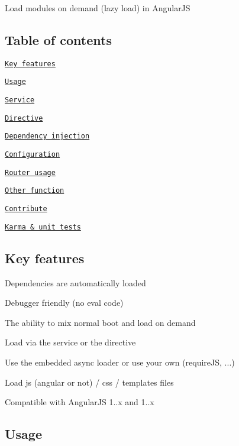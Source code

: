 Load modules on demand (lazy load) in Angular\+JS

\subsection*{Table of contents}


\begin{DoxyEnumerate}
\item \href{#key-features}{\tt Key features}
\item \href{#usage}{\tt Usage}
\item \href{#service}{\tt Service}
\item \href{#directive}{\tt Directive}
\item \href{#bonus-use-dependency-injection}{\tt Dependency injection}
\item \href{#configuration}{\tt Configuration}
\item \href{#works-well-with-your-router}{\tt Router usage}
\item \href{#other-functions}{\tt Other function}
\item \href{#contribute}{\tt Contribute}
\item \href{#karma--unit-tests}{\tt Karma \& unit tests}
\end{DoxyEnumerate}

\subsection*{Key features}


\begin{DoxyItemize}
\item Dependencies are automatically loaded
\item Debugger friendly (no eval code)
\item The ability to mix normal boot and load on demand
\item Load via the service or the directive
\item Use the embedded async loader or use your own (require\+JS, ...)
\item Load js (angular or not) / css / templates files
\item Compatible with Angular\+JS 1..\+x and 1..\+x
\end{DoxyItemize}

\subsection*{Usage}


